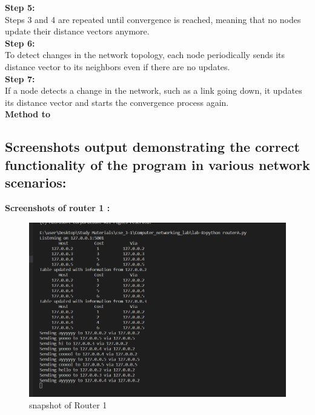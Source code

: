\documentclass[11pt]{article}
\begin{document}
\textbf{Step 5: }\\[12pt]
Steps 3 and 4 are repeated until convergence is reached, meaning that no nodes update their distance vectors anymore.\\[12pt]

\textbf{Step 6: }\\[12pt]
To detect changes in the network topology, each node periodically sends its distance vector to its neighbors even if there are no updates.\\[12pt]

\textbf{Step 7: }\\[12pt]
If a node detects a change in the network, such as a link going down, it updates its distance vector and starts the convergence process again.\\[12pt]


\textbf{Method to  }\\[12pt]


\subsection{Screenshots output demonstrating the correct functionality of the program in various network scenarios: }

\textbf{Screenshots of router 1 : }\\[12pt]
 \begin{figure}[!h]
\centering
\includegraphics[width=\textwidth]{rA.png}
\caption{snapshot of Router 1}
\end{figure}
\FloatBarrier
\end{document}
